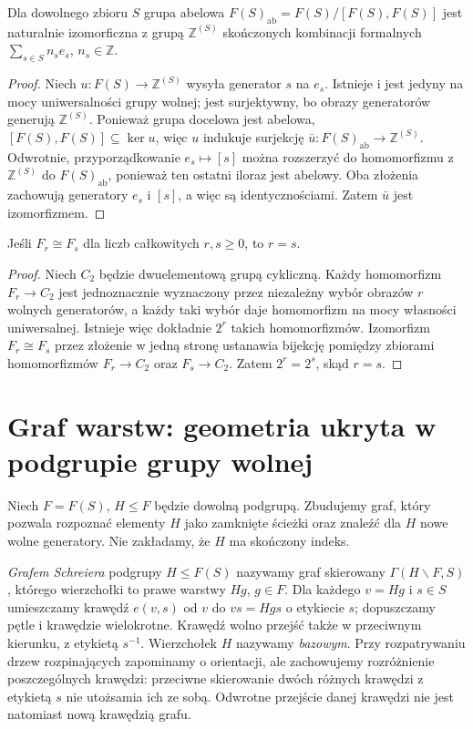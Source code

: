 \begin{twierdzenie}
\label{aa:tw:free-abelianization}
Dla dowolnego zbioru $S$ grupa abelowa $F(S)_{\mathrm{ab}}=
F(S)/[F(S),F(S)]$ jest naturalnie izomorficzna z grupą
$\mathbb Z^{(S)}$ skończonych kombinacji formalnych
$\sum_{s\in S}n_s e_s$, $n_s\in\mathbb Z$.
\end{twierdzenie}
\begin{proof}
Niech $u:F(S)\to\mathbb Z^{(S)}$ wysyła generator $s$ na
$e_s$. Istnieje i jest jedyny na mocy uniwersalności grupy
wolnej; jest surjektywny, bo obrazy generatorów generują
$\mathbb Z^{(S)}$. Ponieważ grupa docelowa jest abelowa,
$[F(S),F(S)]\subseteq\ker u$, więc $u$ indukuje surjekcję
$\bar u:F(S)_{\mathrm{ab}}\to\mathbb Z^{(S)}$.
Odwrotnie, przyporządkowanie $e_s\mapsto[s]$ można
rozszerzyć do homomorfizmu z $\mathbb Z^{(S)}$ do
$F(S)_{\mathrm{ab}}$, ponieważ ten ostatni iloraz jest abelowy.
Oba złożenia zachowują generatory $e_s$ i $[s]$, a więc
są identycznościami. Zatem $\bar u$ jest izomorfizmem.
\end{proof}


\begin{stwierdzenie}
\label{aa:st:free-rank-invariant}
Jeśli $F_r\cong F_s$ dla liczb całkowitych $r,s\ge0$,
to $r=s$.
\end{stwierdzenie}
\begin{proof}
Niech $C_2$ będzie dwuelementową grupą cykliczną.
Każdy homomorfizm $F_r\to C_2$ jest jednoznacznie wyznaczony
przez niezależny wybór obrazów $r$ wolnych generatorów,
a każdy taki wybór daje homomorfizm na mocy własności
uniwersalnej. Istnieje więc dokładnie $2^r$ takich homomorfizmów.
Izomorfizm $F_r\cong F_s$ przez złożenie w jedną stronę
ustanawia bijekcję pomiędzy zbiorami homomorfizmów
$F_r\to C_2$ oraz $F_s\to C_2$.
Zatem $2^r=2^s$, skąd $r=s$.
\end{proof}

\section{Graf warstw: geometria ukryta w podgrupie grupy wolnej}
Niech $F=F(S)$, $H\le F$ będzie dowolną podgrupą.
Zbudujemy graf, który pozwala rozpoznać elementy $H$ jako
zamknięte ścieżki oraz znaleźć dla $H$ nowe wolne generatory.
Nie zakładamy, że $H$ ma skończony indeks.

\begin{definicja}
\label{aa:def:schreier-graph}
\emph{Grafem Schreiera} podgrupy $H\le F(S)$ nazywamy graf
skierowany $\Gamma(H\backslash F,S)$, którego wierzchołki
to prawe warstwy $Hg$, $g\in F$. Dla każdego $v=Hg$ i $s\in S$
umieszczamy krawędź $e(v,s)$ od $v$ do $v s=Hgs$
o etykiecie $s$; dopuszczamy pętle i krawędzie wielokrotne.
Krawędź wolno przejść także w przeciwnym kierunku, z etykietą $s^{-1}$.
Wierzchołek $H$ nazywamy \emph{bazowym}.
Przy rozpatrywaniu drzew rozpinających zapominamy o orientacji,
ale zachowujemy rozróżnienie poszczególnych krawędzi:
przeciwne skierowanie dwóch różnych krawędzi z etykietą $s$
nie utożsamia ich ze sobą. Odwrotne przejście danej krawędzi
nie jest natomiast nową krawędzią grafu.
\end{definicja}

